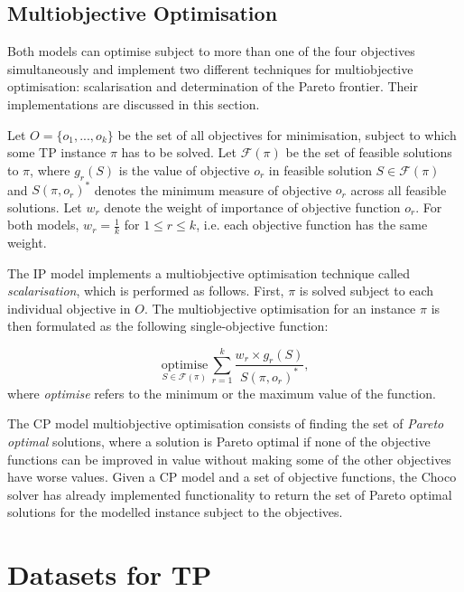 \documentclass{mpaper}
\begin{document}
\subsection{Multiobjective Optimisation}
\label{multiobjOpt}

Both models can optimise subject to more than one of the four objectives simultaneously and implement two different techniques for multiobjective optimisation: scalarisation and determination of the Pareto frontier. Their implementations are discussed in this section.

Let $O = \{o_1,...,o_k\}$ be the set of all objectives for minimisation, subject to which some TP instance $\pi$ has to be solved. 
Let $\mathcal{F}(\pi)$ be the set of feasible solutions to $\pi$, where $g_r(S)$ is the value of objective $o_r$ in feasible solution $S \in \mathcal{F}(\pi)$ and $S(\pi, o_r)^\ast$ denotes the minimum measure of objective $o_r$ across all feasible solutions. Let $w_r$ denote the weight of importance of objective function $o_r$. For both models, $w_r = \frac{1}{k}$ for $1 \leq r \leq k$, i.e. each objective function has the same weight.

The IP model implements a multiobjective optimisation technique called \textit{scalarisation}, which is performed as follows. First, $\pi$ is solved subject to each individual objective in $O$. The multiobjective optimisation for an instance $\pi$ is then formulated as the following single-objective function:

\begin{equation}
\label{eq:ipmultiobj}
\underset{S \in \mathcal{F}(\pi)}{\textrm{optimise}} \, \sum_{r=1}^{k} \frac{w_r \times g_r(S)}{S(\pi, o_r)^\ast}\textrm{,}
\end{equation}
where \textit{optimise} refers to the minimum or the maximum value of the function.

The CP model multiobjective optimisation consists of finding the set of \textit{Pareto optimal} solutions, where a solution is Pareto optimal if none of the objective functions can be improved in value without making some of the other objectives have worse values. Given a CP model and a set of objective functions, the Choco solver has already implemented functionality to return the set of Pareto optimal solutions for the modelled instance subject to the objectives.

\section{Datasets for TP}
\label{skyscannerdata}
\end{document}
